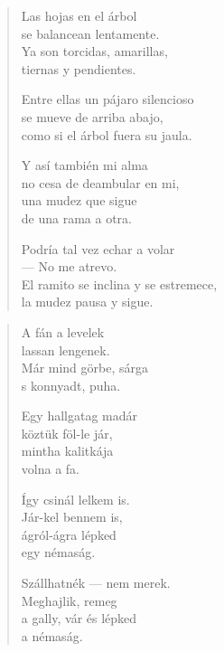 \documentclass[11pt]{extbook}
\newcommand*{\centeredornament}{\centerline{\pgfornament[width=6cm]{88}}}
\begin{document}
\newpage


\vspace*{-15mm}
\centeredornament


\label{las_hojas_en_el_arbol}

\begin{verse}
  Las hojas en el árbol \\
  se balancean lentamente. \\
  Ya son torcidas, amarillas, \\
  tiernas y pendientes.

  Entre ellas un pájaro silencioso \\
  se mueve de arriba abajo, \\
  como si el árbol fuera su jaula.

  Y así también mi alma \\
  no cesa de deambular en mi, \\
  una mudez que sigue \\
  de una rama a otra.

  Podría tal vez echar a volar \\
  --- No me atrevo. \\
  El ramito se inclina y se estremece, \\
  la mudez pausa y sigue.
\end{verse}

\newpage

\vspace*{-15mm}
\centeredornament



\begin{verse}
  A fán a levelek \\
  lassan lengenek. \\
  Már mind görbe, sárga \\
  s konnyadt, puha.

  Egy hallgatag madár \\
  köztük föl-le jár, \\
  mintha kalitkája \\
  volna a fa.

  Így csinál lelkem is. \\
  Jár-kel bennem is, \\
  ágról-ágra lépked \\
  egy némaság.

  Szállhatnék --- nem merek. \\
  Meghajlik, remeg \\
  a gally, vár és lépked \\
  a némaság.
\end{verse}
\end{document}
